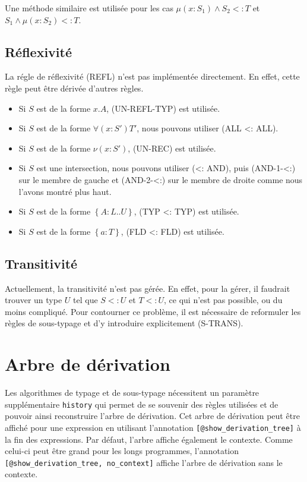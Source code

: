Une méthode similaire est utilisée pour les cas $\mu(x : S_{1}) \wedge S_{2} <:
T$ et $S_{1} \wedge \mu(x : S_{2}) <: T$.

\subsection*{Réflexivité}

La régle de réflexivité (REFL) n'est pas implémentée directement. En effet,
cette règle peut être dérivée d'autres règles.

\begin{itemize}
  \item Si $S$ est de la forme $x.A$, (UN-REFL-TYP) est utilisée.
  \item Si $S$ est de la forme $\forall(x : S') T'$, nous pouvons utiliser (ALL
    <: ALL).
  \item Si $S$ est de la forme $\nu(x : S')$, (UN-REC) est utilisée.
  \item Si $S$ est une intersection, nous pouvons utiliser (<: AND), puis
    (AND-1-<:) sur le membre de gauche et (AND-2-<:) sur le membre de droite
    comme nous l'avons montré plus haut.
  \item Si $S$ est de la forme $\left\{ A : L .. U \right\}$, (TYP <: TYP) est utilisée.
  \item Si $S$ est de la forme $\left\{ a : T \right\}$, (FLD <: FLD) est utilisée.
\end{itemize}

\subsection*{Transitivité}

Actuellement, la transitivité n'est pas gérée. En effet, pour la gérer, il
faudrait trouver un type $U$ tel que $S <: U$ et $T <: U$, ce qui n'est pas
possible, ou du moins compliqué. Pour contourner ce problème, il est
nécessaire de reformuler les règles de sous-typage et d'y introduire
explicitement (S-TRANS).

\section{Arbre de dérivation}

Les algorithmes de typage et de sous-typage nécessitent un paramètre
supplémentaire \verb|history| qui permet de se souvenir des règles
utilisées et de pouvoir ainsi reconstruire l'arbre de dérivation. Cet arbre de
dérivation peut être affiché pour une expression en utilisant l'annotation
\verb|[@show_derivation_tree]| à la fin des expressions. Par défaut, l'arbre
affiche également le contexte. Comme celui-ci peut être grand pour les
longs programmes, l'annotation \\ \verb|[@show_derivation_tree, no_context]|
affiche l'arbre de dérivation sans le contexte.

